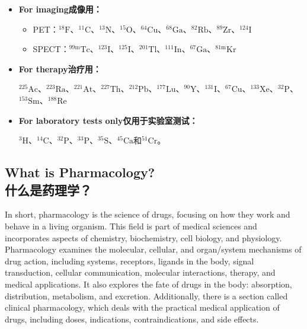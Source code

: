 \documentclass[dvipsnames, svgnames,a4paper,11pt]{article}
\begin{document}
\begin{itemize}

      \item \textbf{For imaging成像用：}

            \begin{itemize}

                  \item PET：${}^\text{18}\text{F}$、${}^\text{11}\text{C}$、${}^\text{13}\text{N}$、${}^\text{15}\text{O}$、${}^\text{64}\text{Cu}$、${}^\text{68}\text{Ga}$、${}^\text{82}\text{Rb}$、${}^\text{89}\text{Zr}$、${}^\text{124}\text{I}$

                  \item SPECT：${}^\text{99m}\text{Tc}$、${}^\text{123}\text{I}$、${}^\text{125}\text{I}$、${}^\text{201}\text{Tl}$、${}^\text{111}\text{In}$、${}^\text{67}\text{Ga}$、${}^\text{81m}\text{Kr}$

            \end{itemize}

      \item \textbf{For therapy治疗用：}

            ${}^\text{225}\text{Ac}$、${}^\text{223}\text{Ra}$、${}^\text{221}\text{At}$、${}^\text{227}\text{Th}$、${}^\text{212}\text{Pb}$、${}^\text{177}\text{Lu}$、${}^\text{90}\text{Y}$、${}^\text{131}\text{I}$、${}^\text{67}\text{Cu}$、${}^\text{133}\text{Xe}$、${}^\text{32}\text{P}$、${}^\text{153}\text{Sm}$、${}^\text{188}\text{Re}$

      \item \textbf{For laboratory tests only仅用于实验室测试：}

            ${}^\text{3}\text{H}$、${}^\text{14}\text{C}$、${}^\text{32}\text{P}$、${}^\text{33}\text{P}$、${}^\text{35}\text{S}$、${}^\text{45}\text{Ca}$和${}^\text{51}\text{Cr}$。


\end{itemize}

\subsection{What is Pharmacology?\\什么是药理学？}

In short, pharmacology is the science of drugs, focusing on how they work and behave in a living organism. This field is part of medical sciences and incorporates aspects of chemistry, biochemistry, cell biology, and physiology. Pharmacology examines the molecular, cellular, and organ/system mechanisms of drug action, including systems, receptors, ligands in the body, signal transduction, cellular communication, molecular interactions, therapy, and medical applications. It also explores the fate of drugs in the body: absorption, distribution, metabolism, and excretion. Additionally, there is a section called clinical pharmacology, which deals with the practical medical application of drugs, including doses, indications, contraindications, and side effects.
\end{document}
